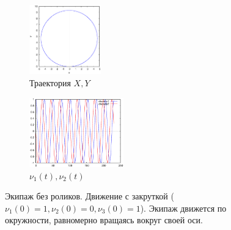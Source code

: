 \begin{figure}
    \centering
    \begin{subfigure}[t]{0.3\textwidth}
        \centering
        \includegraphics[width=\linewidth, height=30mm]{pic/_old_sol__1_0_1__0__230__1e2_trajectory}
        \caption{Траектория $X, Y$}
        \label{fig:_old_sol__1_0_1__0__230__1e2_trajectory}
    \end{subfigure}
    \begin{subfigure}[t]{0.3\textwidth}
        \centering
        \includegraphics[width=\linewidth, height=30mm]{pic/_old_sol__1_0_1__0__230__1e2_nu12}
        \caption{$\nu_1(t), \nu_2(t)$}
        \label{fig:_old_sol__1_0_1__0__230__1e2_nu12}    
    \end{subfigure}
    
    
    \caption{Экипаж без роликов. Движение с закруткой ($\nu_1(0) = 1, \nu_2(0) = 0, \nu_3(0) = 1$). Экипаж движется по окружности, равномерно вращаясь вокруг своей оси.}
    \label{fig:old_wrench}
\end{figure}
